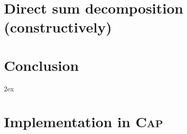 \documentclass{article}
\begin{document}
\newpage
\section{Direct sum decomposition (constructively)}


\newpage


\section{Conclusion}


\begingroup
     \parindent 0pt
     \parskip 2ex
     \def\enotesize{\normalsize}
     \theendnotes
\endgroup 



\appendix
\renewcommand{\thesection}{\Alph{section}}
\section{Implementation in \textsc{Cap}}

\end{document}
